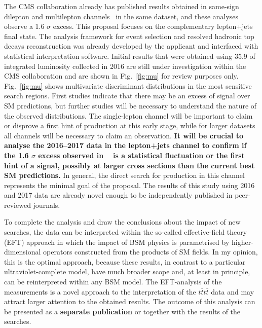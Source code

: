 { The CMS collaboration already has published results obtained in same-sign dilepton and multilepton channels~\cite{Sirunyan:2017roi} in the same dataset, and these analyses observe a 1.6 $\sigma$ excess. This proposal focuses on the complementary lepton+jets final state. The analysis framework for event selection and resolved hadronic top decays reconstruction was already developed by the applicant and interfaced with statistical interpretation software. Initial results that were obtained using 35.9 \invfb of integrated luminosity collected in 2016 are still under investigation within the CMS collaboration and are shown in Fig.~\ref{fig:mu} for review purposes only. Fig.~\ref{fig:mu} shows multivariate discriminant distributions in the most sensitive search regions. First studies indicate that there may be an excess of signal over SM predictions, but further studies will be necessary to understand the nature of the observed distributions. The single-lepton channel will be important to claim or disprove a first hint of \tttt production at this early stage, while for larger datasets all channels will be necessary to claim an observation. \textbf{It will be crucial to analyse the 2016--2017 data in the lepton+jets channel to confirm if the 1.6 $\sigma$ excess observed in ~\cite{Sirunyan:2017roi} is a statistical fluctuation or the first hint of a signal, possibly at larger cross sections than the current best SM predictions.} In general, the direct search for \tttt production in this channel represents the minimal goal of the proposal. The results of this study using 2016 and 2017 data are already novel enough to be independently published in peer-reviewed journals. }

\textcolor{\mynew}{
To complete the analysis and draw the conclusions about the impact of new searches, the data can be interpreted within the so-called effective-field theory (EFT) approach in which the impact of BSM physics is parametrised by higher-dimensional operators constructed from the products of SM fields. In my opinion, this is the optimal approach, because these results, in contrast to a particular ultraviolet-complete model, have much broader scope and, at least in principle, can be reinterpreted within any BSM model. The EFT-analysis of the measurements is a novel approach to the interpretation of the $t\bar{t}t\bar{t}$ data and may attract larger attention to the obtained results. The outcome of this analysis can be presented as a \textbf{separate publication} or together with the results of the searches. }

